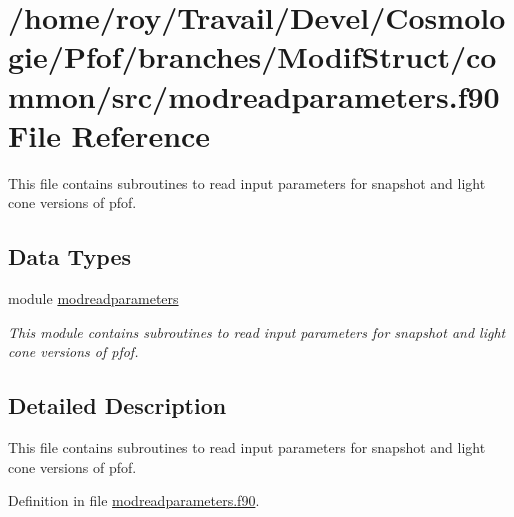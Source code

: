 \hypertarget{modreadparameters_8f90}{\section{/home/roy/\-Travail/\-Devel/\-Cosmologie/\-Pfof/branches/\-Modif\-Struct/common/src/modreadparameters.f90 File Reference}
\label{modreadparameters_8f90}
}


This file contains subroutines to read input parameters for snapshot and light cone versions of pfof.  


\subsection*{Data Types}
\begin{DoxyCompactItemize}
\item 
module \hyperlink{classmodreadparameters}{modreadparameters}
\begin{DoxyCompactList}\small\item\em This module contains subroutines to read input parameters for snapshot and light cone versions of pfof. \end{DoxyCompactList}\end{DoxyCompactItemize}


\subsection{Detailed Description}
This file contains subroutines to read input parameters for snapshot and light cone versions of pfof. 

Definition in file \hyperlink{modreadparameters_8f90_source}{modreadparameters.\-f90}.

